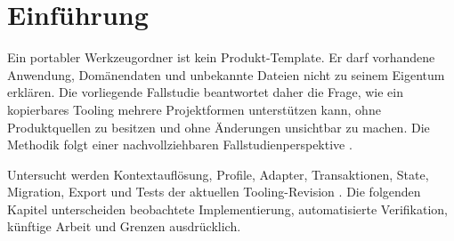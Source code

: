 \section{Einführung}
\label{chap:introduction}

Ein portabler Werkzeugordner ist kein Produkt-Template. Er darf vorhandene Anwendung,
Domänendaten und unbekannte Dateien nicht zu seinem Eigentum erklären. Die vorliegende
Fallstudie beantwortet daher die Frage, wie ein kopierbares Tooling mehrere Projektformen
unterstützen kann, ohne Produktquellen zu besitzen und ohne Änderungen unsichtbar zu
machen. Die Methodik folgt einer nachvollziehbaren Fallstudienperspektive
\parencite{runeson2009case-study}.

Untersucht werden Kontextauflösung, Profile, Adapter, Transaktionen, State, Migration,
Export und Tests der aktuellen Tooling-Revision \parencite{template-tooling-source}.
Die folgenden Kapitel unterscheiden beobachtete Implementierung, automatisierte
Verifikation, künftige Arbeit und Grenzen ausdrücklich.
